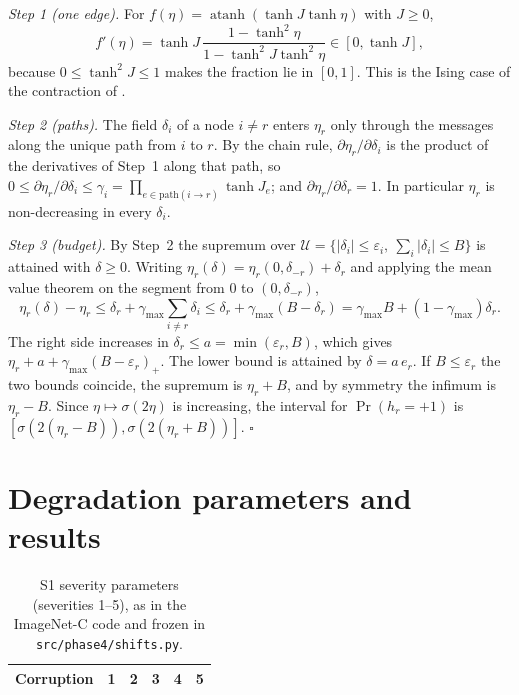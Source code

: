 \emph{Step 1 (one edge).} For $f(\eta)=\operatorname{atanh}(\tanh J\tanh\eta)$ with $J\ge0$,
\[f'(\eta)=\tanh J\,\frac{1-\tanh^2\eta}{1-\tanh^2J\tanh^2\eta}\in[0,\tanh J],\]
because $0\le\tanh^2J\le1$ makes the fraction lie in $[0,1]$. This is the Ising case of the contraction of \citet[Theorem~8]{ihler2005loopy}.

\emph{Step 2 (paths).} The field $\delta_i$ of a node $i\ne r$ enters $\eta_r$ only through the messages along the unique path from $i$ to $r$. By the chain rule, $\partial\eta_r/\partial\delta_i$ is the product of the derivatives of Step~1 along that path, so $0\le\partial\eta_r/\partial\delta_i\le\gamma_i=\prod_{e\in\mathrm{path}(i\to r)}\tanh J_e$; and $\partial\eta_r/\partial\delta_r=1$. In particular $\eta_r$ is non-decreasing in every $\delta_i$.

\emph{Step 3 (budget).} By Step~2 the supremum over $\mathcal U=\{|\delta_i|\le\varepsilon_i,\ \sum_i|\delta_i|\le B\}$ is attained with $\delta\ge0$. Writing $\eta_r(\delta)=\eta_r(0,\delta_{-r})+\delta_r$ and applying the mean value theorem on the segment from $0$ to $(0,\delta_{-r})$,
\[\eta_r(\delta)-\eta_r\le\delta_r+\gamma_{\max}\sum_{i\ne r}\delta_i\le\delta_r+\gamma_{\max}(B-\delta_r)=\gamma_{\max}B+(1-\gamma_{\max})\delta_r .\]
The right side increases in $\delta_r\le a=\min(\varepsilon_r,B)$, which gives $\eta_r+a+\gamma_{\max}(B-\varepsilon_r)_+$. The lower bound is attained by $\delta=a\,e_r$. If $B\le\varepsilon_r$ the two bounds coincide, the supremum is $\eta_r+B$, and by symmetry the infimum is $\eta_r-B$. Since $\eta\mapsto\sigma(2\eta)$ is increasing, the interval for $\Pr(h_r=+1)$ is $[\sigma(2(\eta_r-B)),\sigma(2(\eta_r+B))]$. \hfill$\square$

\section{Degradation parameters and results}
\begin{table}[h]\centering\small
\caption{S1 severity parameters (severities 1--5), as in the ImageNet-C code and frozen in \texttt{src/phase4/shifts.py}.}\label{tab:s1params}
\begin{tabular}{@{}lrrrrr@{}}\toprule
Corruption & 1 & 2 & 3 & 4 & 5\\\midrule
\end{tabular}
\end{table}
\begin{widetable}[h]\centering\scriptsize\setlength{\tabcolsep}{3pt}
\caption{All S1 conditions (target 0.10).}\label{tab:s1}
\end{widetable}

